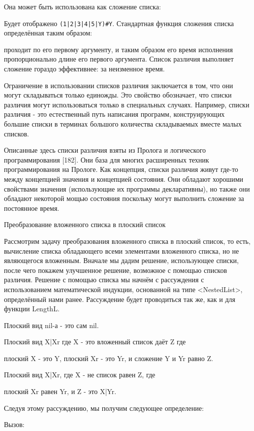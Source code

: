 Она может быть использована как сложение списка:

Будет отображено \verb!(1|2|3|4|5|Y)#Y!. Стандартная функция сложения списка определённая таким образом:

проходит по его первому аргументу, и таким образом его время исполнения пропорционально длине его первого аргумента. Список различия выполняет сложение гораздо эффективнее: за неизменное время.

Ограничение в использовании списков различия заключается в том, что они могут складываться только единожды. Это свойство обозначает, что списки различия могут использоваться только в специальных случаях. Например, списки различия - это естественный путь написания программ, конструирующих большие списки в терминах большого количества складываемых вместе малых списков.

Описанные здесь списки различия взяты из Пролога и логического программирования [182]. Они база для многих расширенных техник программирования на Прологе. Как концепция, списки различия живут где-то между концепцией значения и концепцией состояния. Они обладают хорошими свойствами значения (использующие их программы декларативны), но также они обладают некоторой мощью состояния поскольку могут выполнить сложение за постоянное время.

Преобразование вложенного списка в плоский список

Рассмотрим задачу преобразования вложенного списка в плоский список, то есть, вычисление списка обладающего всеми элементами вложенного списка, но не являющегося вложенным. Вначале мы дадим решение, использующее списки, после чего покажем улучшенное решение, возможное с помощью списков различия. Решение с помощью списка мы начнём с рассуждения с использованием математической индукции, основанной на типе <NestedList>, определённый нами ранее. Рассуждение будет проводиться так же, как и для функции LengthL.

Плоский вид nil-а - это сам nil.

Плоский вид X|Xr где X - это вложенный список даёт Z где

плоский X - это Y,
плоский Xr - это Yr, и
сложение Y и Yr равно Z.

Плоский вид X|Xr, где X - не список равен Z, где

плоский Xr равен Yr, и
Z - это X|Yr.

Следуя этому рассуждению, мы получим следующее определение:

Вызов:

